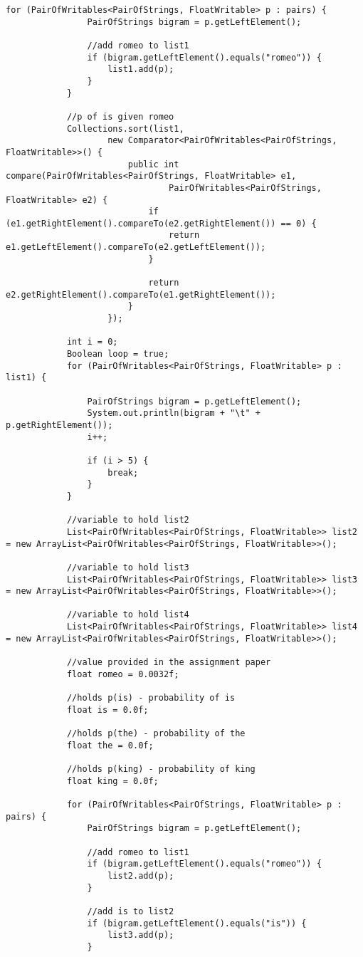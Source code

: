 \documentclass{article} %
\begin{document}
\begin{lstlisting}[style=Java]
			for (PairOfWritables<PairOfStrings, FloatWritable> p : pairs) {
				PairOfStrings bigram = p.getLeftElement();

				//add romeo to list1
				if (bigram.getLeftElement().equals("romeo")) {
					list1.add(p);
				}
			}
			
			//p of is given romeo
			Collections.sort(list1,
					new Comparator<PairOfWritables<PairOfStrings, FloatWritable>>() {
						public int compare(PairOfWritables<PairOfStrings, FloatWritable> e1,
								PairOfWritables<PairOfStrings, FloatWritable> e2) {
							if (e1.getRightElement().compareTo(e2.getRightElement()) == 0) {
								return e1.getLeftElement().compareTo(e2.getLeftElement());
							}

							return e2.getRightElement().compareTo(e1.getRightElement());
						}
					});

			int i = 0;
			Boolean loop = true;
			for (PairOfWritables<PairOfStrings, FloatWritable> p : list1) {
				
				PairOfStrings bigram = p.getLeftElement();
				System.out.println(bigram + "\t" + p.getRightElement());
				i++;
				
				if (i > 5) {
					break;
				}
			}
			
			//variable to hold list2
			List<PairOfWritables<PairOfStrings, FloatWritable>> list2 = new ArrayList<PairOfWritables<PairOfStrings, FloatWritable>>();
			
			//variable to hold list3
			List<PairOfWritables<PairOfStrings, FloatWritable>> list3 = new ArrayList<PairOfWritables<PairOfStrings, FloatWritable>>();
			
			//variable to hold list4
			List<PairOfWritables<PairOfStrings, FloatWritable>> list4 = new ArrayList<PairOfWritables<PairOfStrings, FloatWritable>>();
			
			//value provided in the assignment paper
			float romeo = 0.0032f;
			
			//holds p(is) - probability of is
			float is = 0.0f;
			
			//holds p(the) - probability of the
			float the = 0.0f;
			
			//holds p(king) - probability of king
			float king = 0.0f;
			
			for (PairOfWritables<PairOfStrings, FloatWritable> p : pairs) {
				PairOfStrings bigram = p.getLeftElement();

				//add romeo to list1
				if (bigram.getLeftElement().equals("romeo")) {
					list2.add(p);
				}
				
				//add is to list2
				if (bigram.getLeftElement().equals("is")) {
					list3.add(p);
				}
				

\end{lstlisting}
\end{document}

